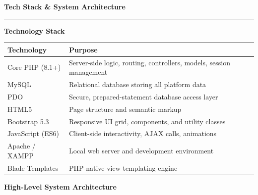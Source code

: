 \documentclass[12pt,a4paper]{report}
\begin{document}
\newpage
\thispagestyle{plain}
{\large\bfseries Tech Stack \& System Architecture}\\[0.6pt]
\rule{\textwidth}{0.6pt}

\vspace{0.4cm}
\textbf{Technology Stack}

\vspace{0.2cm}
\begin{tabular}{@{}L{3.8cm} L{10cm}@{}}
    \toprule
    \color{white}\textbf{Technology} & \color{white}\textbf{Purpose} \\
    \midrule
    Core PHP (8.1+) & Server-side logic, routing, controllers, models, session management \\
    MySQL & Relational database storing all platform data \\
    PDO & Secure, prepared-statement database access layer \\
    HTML5 & Page structure and semantic markup \\
    Bootstrap 5.3 & Responsive UI grid, components, and utility classes \\
    JavaScript (ES6) & Client-side interactivity, AJAX calls, animations \\
    Apache / XAMPP & Local web server and development environment \\
    Blade Templates & PHP-native view templating engine \\
    \bottomrule
\end{tabular}

\vspace{0.7cm}
\textbf{High-Level System Architecture}
\end{document}
